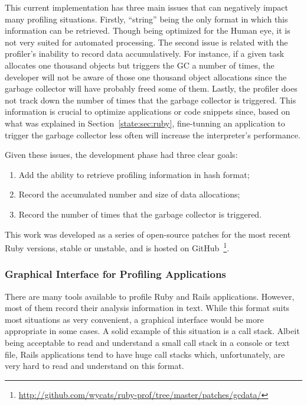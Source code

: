 This current implementation has three main issues that can negatively impact many profiling situations. Firstly, ``string'' being the only format in which this information can be retrieved. Though being optimized for the Human eye, it is not very suited for automated processing. The second issue is related with the profiler's inability to record data accumulatively. For instance, if a given task allocates one thousand objects but triggers the GC a number of times, the developer will not be aware of those one thousand object allocations since the garbage collector will have probably freed some of them. Lastly, the profiler does not track down the number of times that the garbage collector is triggered. This information is crucial to optimize applications or code snippets since, based on what was explained in Section~\ref{state:sec:ruby}, fine-tunning an application to trigger the garbage collector less often will increase the interpreter's performance.

Given these issues, the development phase had three clear goals:
\begin{enumerate}
  \item Add the ability to retrieve profiling information in hash format;
  \item Record the accumulated number and size of data allocations;
  \item Record the number of times that the garbage collector is triggered.
\end{enumerate}

This work was developed as a series of open-source patches for the most recent Ruby versions, stable or unstable, and is hosted on GitHub~\footnote{\url{http://github.com/wycats/ruby-prof/tree/master/patches/gcdata/}}.

\subsubsection{Graphical Interface for Profiling Applications}
There are many tools available to profile Ruby and Rails applications. However, most of them record their analysis information in text. While this format suits most situations as very convenient, a graphical interface would be more appropriate in some cases. A solid example of this situation is a call stack. Albeit being acceptable to read and understand a small call stack in a console or text file, Rails applications tend to have huge call stacks which, unfortunately, are very hard to read and understand on this format.

